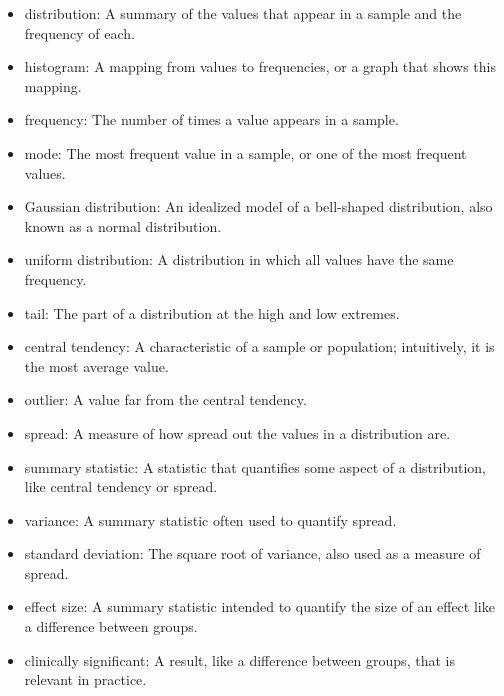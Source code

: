 \documentclass[12pt]{book}
\begin{document}
\begin{itemize}

\item distribution: A summary of the values that appear in a sample
and the frequency of each.

\item histogram: A mapping from values to frequencies, or a graph
that shows this mapping.

\item frequency: The number of times a value appears in a sample.

\item mode: The most frequent value in a sample, or one of the
most frequent values.

\item Gaussian distribution: An idealized model of a bell-shaped distribution,
also known as a normal distribution. 

\item uniform distribution: A distribution in which all values have
the same frequency.

\item tail: The part of a distribution at the high and low extremes.

\item central tendency: A characteristic of a sample or population;
intuitively, it is the most average value. 

\item outlier: A value far from the central tendency.

\item spread: A measure of how spread out the values in a distribution
are.

\item summary statistic: A statistic that quantifies some aspect
of a distribution, like central tendency or spread.

\item variance: A summary statistic often used to quantify spread.

\item standard deviation: The square root of variance, also used
as a measure of spread.

\item effect size: A summary statistic intended to quantify the size
of an effect like a difference between groups.

\item clinically significant: A result, like a difference between groups,
that is relevant in practice.

\end{itemize}
\end{document}
